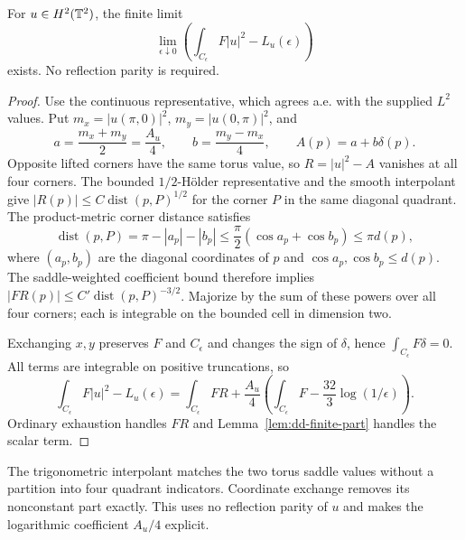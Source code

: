 \begin{lemma}
\label{lem:dd-potential-mass-finite-part}
\leanok
For $u\in H^2(\mathbb{T}^2)$, the finite limit
\[
 \lim_{\epsilon\downarrow0}
 \left(\int_{C_\epsilon}F|u|^2-L_u(\epsilon)\right)
\]
exists. No reflection parity is required.
\end{lemma}

\begin{proof}
\leanok
Use the continuous representative, which agrees a.e. with the supplied
$L^2$ values. Put $m_x=|u(\pi,0)|^2$, $m_y=|u(0,\pi)|^2$, and
\[
 a=\frac{m_x+m_y}{2}=\frac{A_u}{4},\qquad
 b=\frac{m_y-m_x}{4},\qquad A(p)=a+b\delta(p).
\]
Opposite lifted corners have the same torus value, so $R=|u|^2-A$
vanishes at all four corners.
The bounded $1/2$-H\"older representative and the smooth interpolant give
$|R(p)|\le C\operatorname{dist}(p,P)^{1/2}$ for the corner $P$ in the
same diagonal quadrant. The product-metric corner distance satisfies
\[
 \operatorname{dist}(p,P)=\pi-|a_p|-|b_p|
 \le\frac\pi2(\cos a_p+\cos b_p)\le\pi d(p),
\]
where $(a_p,b_p)$ are the diagonal coordinates of $p$ and
$\cos a_p,\cos b_p\le d(p)$.
The saddle-weighted coefficient bound therefore implies
$|FR(p)|\le C'\operatorname{dist}(p,P)^{-3/2}$.
Majorize by the sum of these powers over all four corners; each is
integrable on the bounded cell in dimension two.

Exchanging $x,y$ preserves $F$ and $C_\epsilon$ and changes the sign of
$\delta$, hence $\int_{C_\epsilon}F\delta=0$.
All terms are integrable on positive truncations, so
\[
 \int_{C_\epsilon}F|u|^2-L_u(\epsilon)
 =\int_{C_\epsilon}FR+
   \frac{A_u}{4}\left(\int_{C_\epsilon}F-\frac{32}{3}\log(1/\epsilon)\right).
\]
Ordinary exhaustion handles $FR$ and Lemma~\ref{lem:dd-finite-part}
handles the scalar term.
\end{proof}

\begin{remark}
The trigonometric interpolant matches the two torus saddle values without
a partition into four quadrant indicators. Coordinate exchange removes its
nonconstant part exactly. This uses no reflection parity of $u$ and makes
the logarithmic coefficient $A_u/4$ explicit.
\end{remark}


